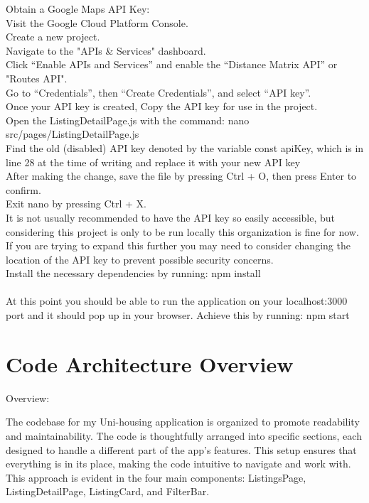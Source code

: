 \documentclass[10pt,twocolumn]{article}
\begin{document}
Obtain a Google Maps API Key:\\
Visit the Google Cloud Platform Console.\\
Create a new project.\\
Navigate to the "APIs \& Services" dashboard.\\
Click “Enable APIs and Services” and enable the “Distance Matrix API” or "Routes API".\\
Go to “Credentials”, then “Create Credentials”, and select “API key”. \\
Once your API key is created, Copy the API key for use in the project. \\
Open the ListingDetailPage.js with the command: nano src/pages/ListingDetailPage.js\\
Find the old (disabled) API key denoted by the variable const apiKey, which is in line 28 at the time of writing and replace it with your new API key\\
After making the change, save the file by pressing Ctrl + O, then press Enter to confirm.\\
Exit nano by pressing Ctrl + X.\\
It is not usually recommended to have the API key so easily accessible, but considering this project is only to be run locally this organization is fine for now. If you are trying to expand this further you may need to consider changing the location of the API key to prevent possible security concerns. \\

Install the necessary dependencies by running: npm install\\
\\
At this point you should be able to run the application on your localhost:3000 port and it should pop up in your browser. Achieve this by running: npm start \\




\section{Code Architecture Overview}


Overview:

The codebase for my Uni-housing application is organized to promote readability and maintainability. The code is thoughtfully arranged into specific sections, each designed to handle a different part of the app's features. This setup ensures that everything is in its place, making the code intuitive to navigate and work with. This approach is evident in the four main components: ListingsPage, ListingDetailPage, ListingCard, and FilterBar.
\end{document}
